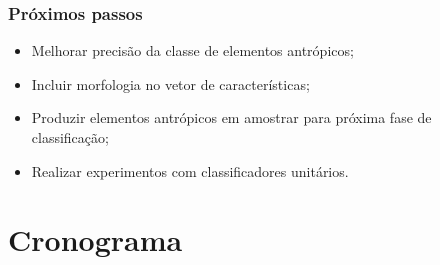 \documentclass[t]{beamer}
\begin{document}
\begin{frame}
	\frametitle{Próximos passos}

	\begin{itemize}
		\item Melhorar precisão da classe de elementos antrópicos;
		\item Incluir morfologia no vetor de características;
		\item Produzir elementos antrópicos em amostrar para próxima fase de classificação;
		\item Realizar experimentos com classificadores unitários.
	\end{itemize}

\end{frame}

\section{Cronograma}
\end{document}
